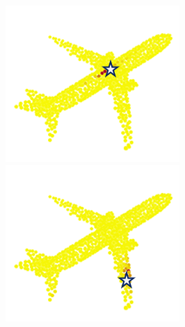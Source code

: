 \documentclass[letterpaper]{article} %
\begin{document}
\begin{figure}[htbp]
\begin{center}
\begin{minipage}[b]{0.8\linewidth}
\begin{center}
\begin{minipage}[b]{0.12\linewidth}
\begin{center}
\includegraphics[width=1.0\linewidth]{images/atten_pic/dgcnn_airplane_feature_2.png}
\end{center}
\end{minipage}
\begin{minipage}[b]{0.12\linewidth}
\begin{center}
\includegraphics[width=1.0\linewidth]{images/atten_pic/dgcnn_airplane_feature_3.png}

\end{center}
\end{minipage}
\end{center}
\end{minipage}
\end{center}
\end{figure}
\end{document}
